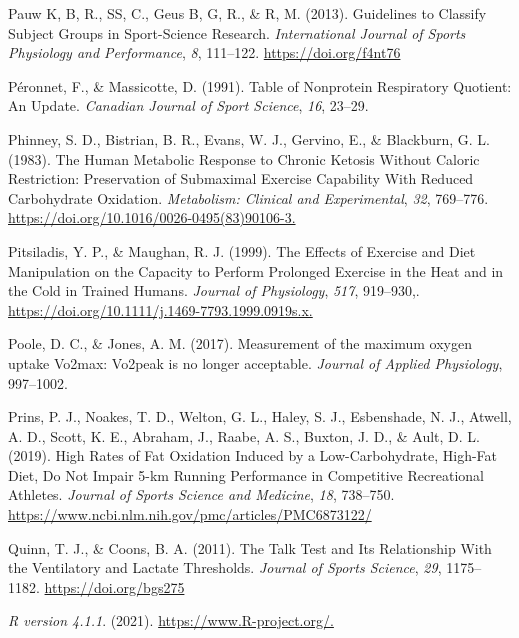 \documentclass[]{cik}%
\newlength{\cslhangindent}
\newlength{\cslentryspacingunit} %
\newenvironment{CSLReferences}[2] %
 {%
  \setlength{\parindent}{0pt}
  \ifodd #1
  \let\oldpar\par
  \def\par{\hangindent=\cslhangindent\oldpar}
  \fi
  \setlength{\parskip}{#2\cslentryspacingunit}
 }%
 {}
\begin{document}
\begin{CSLReferences}{1}{0}
\leavevmode{}%
Pauw K, B, R., SS, C., Geus B, G, R., \& R, M. (2013). Guidelines to
Classify Subject Groups in Sport-Science Research. \emph{International
Journal of Sports Physiology and Performance}, \emph{8}, 111--122.
\url{https://doi.org/f4nt76}

\leavevmode{}%
Péronnet, F., \& Massicotte, D. (1991). Table of Nonprotein Respiratory
Quotient: An Update. \emph{Canadian Journal of Sport Science},
\emph{16}, 23--29.

\leavevmode{}%
Phinney, S. D., Bistrian, B. R., Evans, W. J., Gervino, E., \&
Blackburn, G. L. (1983). The Human Metabolic Response to Chronic Ketosis
Without Caloric Restriction: Preservation of Submaximal Exercise
Capability With Reduced Carbohydrate Oxidation. \emph{Metabolism:
Clinical and Experimental}, \emph{32}, 769--776.
\url{https://doi.org/10.1016/0026-0495(83)90106-3.}

\leavevmode{}%
Pitsiladis, Y. P., \& Maughan, R. J. (1999). The Effects of Exercise and
Diet Manipulation on the Capacity to Perform Prolonged Exercise in the
Heat and in the Cold in Trained Humans. \emph{Journal of Physiology},
\emph{517}, 919--930,.
\url{https://doi.org/10.1111/j.1469-7793.1999.0919s.x.}

\leavevmode{}%
Poole, D. C., \& Jones, A. M. (2017). Measurement of the maximum oxygen
uptake Vo2max: Vo2peak is no longer acceptable. \emph{Journal of Applied
Physiology}, 997--1002.

\leavevmode{}%
Prins, P. J., Noakes, T. D., Welton, G. L., Haley, S. J., Esbenshade, N.
J., Atwell, A. D., Scott, K. E., Abraham, J., Raabe, A. S., Buxton, J.
D., \& Ault, D. L. (2019). High Rates of Fat Oxidation Induced by a
Low-Carbohydrate, High-Fat Diet, Do Not Impair 5-km Running Performance
in Competitive Recreational Athletes. \emph{Journal of Sports Science
and Medicine}, \emph{18}, 738--750.
\url{https://www.ncbi.nlm.nih.gov/pmc/articles/PMC6873122/}

\leavevmode{}%
Quinn, T. J., \& Coons, B. A. (2011). The Talk Test and Its Relationship
With the Ventilatory and Lactate Thresholds. \emph{Journal of Sports
Science}, \emph{29}, 1175--1182. \url{https://doi.org/bgs275}

\leavevmode{}%
\emph{R version 4.1.1}. (2021). \url{https://www.R-project.org/.}


\end{CSLReferences}
\end{document}
